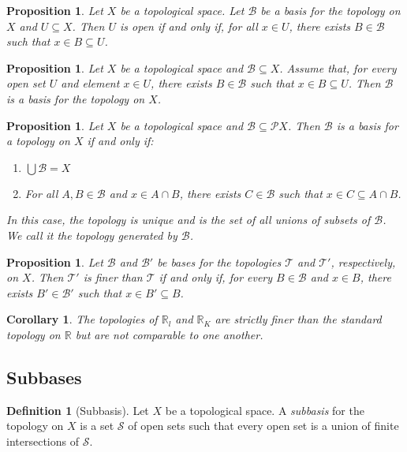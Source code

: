 \documentclass{book}
\newtheorem{prop}[ax]{Proposition}
\newtheorem{cor}{Corollary}[ax]
\theoremstyle{definition}
\newtheorem{df}[ax]{Definition}
\begin{document}
\begin{prop}
Let $X$ be a topological space. Let $\mathcal{B}$ be a basis for the topology on $X$ and $U \subseteq X$. Then $U$ is open if and only if, for all $x \in U$, there exists $B \in \mathcal{B}$ such that $x \in B \subseteq U$.
\end{prop}

\begin{prop}
Let $X$ be a topological space and $\mathcal{B} \subseteq X$. Assume that, for every open set $U$ and element $x \in U$, there exists $B \in \mathcal{B}$ such that $x \in B \subseteq U$. Then $\mathcal{B}$ is a basis for the topology on $X$.
\end{prop}

\begin{prop}
Let $X$ be a topological space and $\mathcal{B} \subseteq \mathcal{P} X$. Then $\mathcal{B}$ is a basis for a topology on $X$ if and only if:
\begin{enumerate}
\item $\bigcup \mathcal{B} = X$
\item For all $A, B \in \mathcal{B}$ and $x \in A \cap B$, there exists $C \in \mathcal{B}$ such that $x \in C \subseteq A \cap B$.
\end{enumerate}
In this case, the topology is unique and is the set of all unions of subsets of $\mathcal{B}$. We call it the topology \emph{generated} by $\mathcal{B}$.
\end{prop}

\begin{prop}
Let $\mathcal{B}$ and $\mathcal{B}'$ be bases for the topologies $\mathcal{T}$ and $\mathcal{T}'$, respectively, on $X$. Then $\mathcal{T}'$ is finer than $\mathcal{T}$ if and only if, for every $B \in \mathcal{B}$ and $x \in B$, there exists $B' \in \mathcal{B}'$ such that $x \in B' \subseteq B$.
\end{prop}

\begin{cor}
The topologies of $\mathbb{R}_l$ and $\mathbb{R}_K$ are strictly finer than the standard topology on $\mathbb{R}$ but are not comparable to one another.
\end{cor}

\subsection{Subbases}

\begin{df}[Subbasis]
Let $X$ be a topological space. A \emph{subbasis} for the topology on $X$ is a set $\mathcal{S}$ of open sets such that every open set is a union of finite intersections of $\mathcal{S}$.
\end{df}
\end{document}
